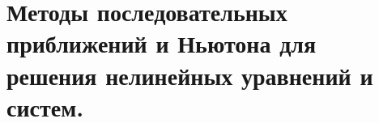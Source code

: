 \documentclass[../../calc-math-exam-2023.tex]{subfiles}
\begin{document}
    \section{Методы последовательных приближений и Ньютона для решения нелинейных уравнений и систем.}\label{sec:ch23}
\end{document}
